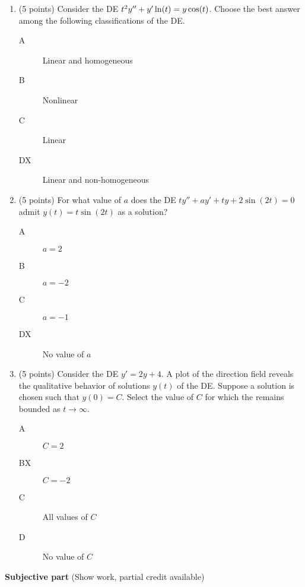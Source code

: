 \documentclass{article}
\begin{document}
\begin{enumerate}

\item (5 points) Consider the DE $t^2y^{\prime\prime} + y\sp\prime\ln(t) = y\cos(t)$.  Choose the best answer among the following classifications of the DE.
\begin{description}
\item[A] Linear and homogeneous
\item[B] Nonlinear 
\item[C] Linear
\item[DX]Linear and non-homogeneous
\end{description}

\item (5 points) For what value of $a$ does the DE $ty'' + a y' + t y + 2 \sin(2t)=0$ admit $y(t) = t \sin(2t)$ as a solution?
\begin{description}
\item[A] $a=2$
\item[B] $a=-2$
\item[C] $a=-1$
\item [DX]No value of $a$
\end{description}

\newpage
\item (5 points) Consider the DE $y' = 2y + 4$.  A plot of the direction field reveals the qualitative behavior of solutions $y(t)$ of the DE.  Suppose a solution is chosen such that $y(0)=C$.  Select the value of $C$ for which the remains bounded as $t \to \infty.$
\begin{description}
\item[A]  $C=2$
\item[BX]$C=-2$		
\item[C] All values of $C$
\item[D] No value of $C$	
\end{description}

\end{enumerate}

\bigskip\noindent
{\bf Subjective part} (Show work, partial credit available)
\end{document}
